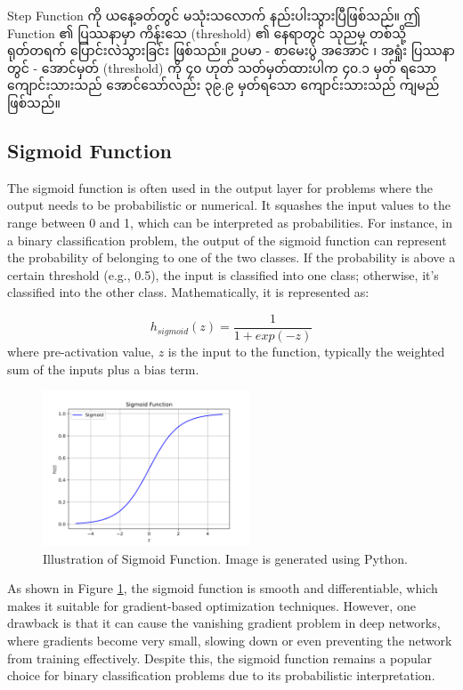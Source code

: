 Step Function ကို ယနေ့ခတ်တွင် မသုံးသလောက် နည်းပါးသွားပြီဖြစ်သည်။ ဤ Function ၏ ပြဿနာမှာ ကိန်းသေ (threshold) ၏ နေရာတွင် သုညမှ တစ်သို့ ရုတ်တရက် ပြောင်းလဲသွားခြင်း ဖြစ်သည်။  ဥပမာ - စာမေးပွဲ အအောင် ၊ အရှုံး ပြဿနာတွင် - အောင်မှတ် (threshold) ကို ၄၀ ဟုတ် သတ်မှတ်ထားပါက ၄၀.၁ မှတ် ရသော ကျောင်းသားသည် အောင်သော်လည်း ၃၉.၉ မှတ်ရသော ကျောင်းသားသည် ကျမည် ဖြစ်သည်။ 

\subsection{Sigmoid Function}
The sigmoid function is often used in the output layer for problems where the output needs to be probabilistic or numerical. It squashes the input values to the range between 0 and 1, which can be interpreted as probabilities. For instance, in a binary classification problem, the output of the sigmoid function can represent the probability of belonging to one of the two classes. If the probability is above a certain threshold (e.g., 0.5), the input is classified into one class; otherwise, it's classified into the other class. Mathematically, it is represented as: 

\begin{equation}\label{eqn:sigmoid}
    h_{sigmoid}(z) = \frac{1}{1 + exp(-z)}
\end{equation} where pre-activation value, $z$ is the input to the function, typically the weighted sum of the inputs plus a bias term. 

\begin{figure}[h]%
\centering
\includegraphics[width=0.55\textwidth]{imgs/sigmoid_fun.png}
\caption{Illustration of Sigmoid Function. Image is generated using Python.}\label{fig:sigmoid}
\end{figure}

As shown in Figure \ref{fig:sigmoid}, the sigmoid function is smooth and differentiable, which makes it suitable for gradient-based optimization techniques. However, one drawback is that it can cause the vanishing gradient problem in deep networks, where gradients become very small, slowing down or even preventing the network from training effectively. Despite this, the sigmoid function remains a popular choice for binary classification problems due to its probabilistic interpretation.

